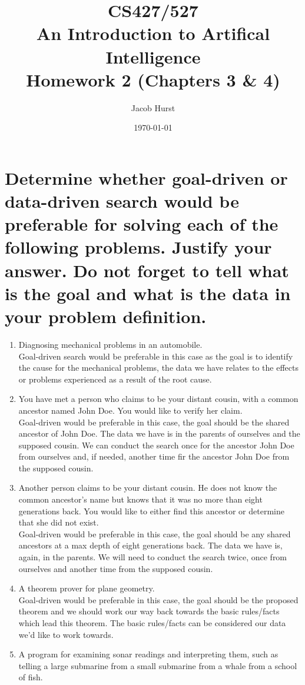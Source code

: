 \documentclass[11pt]{article}
\title{\textbf{CS427/527\\
               An Introduction to Artifical Intelligence\\
               Homework 2 (Chapters 3 \& 4)}}
\author{Jacob Hurst}
\date{\today}
\begin{document}
\maketitle

\section{Determine whether goal-driven or data-driven search would be preferable for solving each of the following problems. Justify your answer. Do not forget to tell what is the goal and what is the data in your problem definition.}

\begin{enumerate}
	\item Diagnosing mechanical problems in an automobile.
	\\ Goal-driven search would be preferable in this case as the goal is to identify the cause for the mechanical problems, the data we have relates to the effects or problems experienced as a result of the root cause.
	\item You have met a person who claims to be your distant cousin, with a common ancestor named John Doe. You would like to verify her claim.
	\\ Goal-driven would be preferable in this case, the goal should be the shared ancestor of John Doe. The data we have is in the parents of ourselves and the supposed cousin. We can conduct the search once for the ancestor John Doe from ourselves and, if needed, another time fir the ancestor John Doe from the supposed cousin.
	\item Another person claims to be your distant cousin. He does not know the common ancestor’s name but knows that it was no more than eight generations back. You would like to either find this ancestor or determine that she did not exist.
	\\ Goal-driven would be preferable in this case, the goal should be any shared ancestors at a max depth of eight generations back. The data we have is, again, in the parents. We will need to conduct the search twice, once from ourselves and another time from the supposed cousin.
	\item A theorem prover for plane geometry.
	\\ Goal-driven would be preferable in this case, the goal should be the proposed theorem and we should work our way back towards the basic rules/facts which lead this theorem. The basic rules/facts can be considered our data we'd like to work towards.
	\item  A program for examining sonar readings and interpreting them, such as telling a large submarine from a small submarine from a whale from a school of fish.

\end{enumerate}
\end{document}

